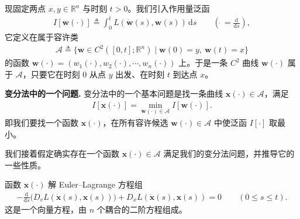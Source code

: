 \documentclass[../../main.tex]{subfiles}
\begin{document}
现固定两点 $x,y\in\mathbb{R}^n$ 与时刻 $t>0$。我们引入作用量泛函
\begin{align}\label{align:ch03-action}
I[\mathbf{w}(\cdot)]\triangleq\int_0^t L(\dot{\mathbf{w}}(s),\mathbf{w}(s))\,\mathrm{d}s \qquad \left(\dot{\ }=\frac{\mathrm{d}}{\mathrm{d}s}\right),
\end{align}
它定义在属于容许类
\begin{align}\label{align:ch03-admissible}
\mathcal{A}\triangleq\{\mathbf{w}\in C^2([0,t];\mathbb{R}^n)\mid\mathbf{w}(0)=y,\ \mathbf{w}(t)=x\}
\end{align}
的函数 $\mathbf{w}(\cdot)=(w_1(\cdot),w_2(\cdot),\cdots,w_n(\cdot))$ 上。于是一条 $C^2$ 曲线 $\mathbf{w}(\cdot)$ 属于 $\mathcal{A}$，只要它在时刻 0 从点 $y$ 出发、在时刻 $t$ 到达点 $x$。

\textbf{变分法中的一个问题.} 变分法中的一个基本问题是找一条曲线 $\mathbf{x}(\cdot)\in\mathcal{A}$，满足
\begin{align}\label{align:ch03-min-action}
I[\mathbf{x}(\cdot)]=\min_{\mathbf{w}(\cdot)\in\mathcal{A}}I[\mathbf{w}(\cdot)].
\end{align}
即我们要找一个函数 $\mathbf{x}(\cdot)$，在所有容许候选 $\mathbf{w}(\cdot)\in\mathcal{A}$ 中使泛函 $I[\cdot]$ 取最小。

我们接着假定确实存在一个函数 $\mathbf{x}(\cdot)\in\mathcal{A}$ 满足我们的变分法问题，并推导它的一些性质。

\begin{theorem}\label{theorem:ch03-euler-lagrange}函数 $\mathbf{x}(\cdot)$ 解 Euler--Lagrange 方程组
\begin{align}\label{align:ch03-euler-lagrange}
-\frac{\mathrm{d}}{\mathrm{d}s}\big(D_v L(\dot{\mathbf{x}}(s),\mathbf{x}(s))\big)+D_x L(\dot{\mathbf{x}}(s),\mathbf{x}(s))=0 \qquad (0\leqslant s\leqslant t).
\end{align}
这是一个向量方程，由 $n$ 个耦合的二阶方程组成。
\end{theorem}
\end{document}
